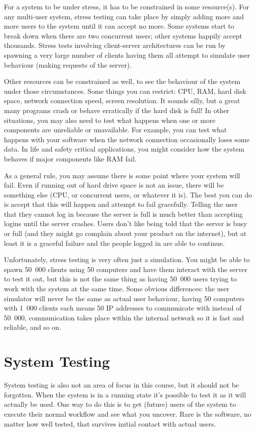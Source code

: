 For a system to be under stress, it has to be constrained in some resource(s). For any multi-user system, stress testing can take place by simply adding more and more users to the system until it can accept no more. Some systems start to break down when there are two concurrent users; other systems happily accept thousands.  Stress tests involving client-server architectures can be run by spawning a very large number of clients having them all attempt to simulate user behaviour (making requests of the server).

Other resources can be constrained as well, to see the behaviour of the system under those circumstances. Some things you can restrict: CPU, RAM, hard disk space, network connection speed, screen resolution. It sounds silly, but a great many programs crash or behave erratically if the hard disk is full! In other situations, you may also need to test what happens when one or more components are unreliable or unavailable. For example, you can test what happens with your software when the network connection occasionally loses some data. In life and safety critical applications, you might consider how the system behaves if major components like RAM fail.

As a general rule, you may assume there is some point where your system will fail. Even if running out of hard drive space is not an issue, there will be something else (CPU, or concurrent users, or whatever it is). The best you can do is accept that this will happen and attempt to fail gracefully. Telling the user that they cannot log in because the server is full is much better than accepting logins until the server crashes. Users don't like being told that the server is busy or full (and they might go complain about your product on the internet), but at least it is a graceful failure and the people logged in are able to continue.

Unfortunately, stress testing is very often just a simulation. You might be able to spawn 50~000 clients using 50 computers and have them interact with the server to test it out, but this is not the same thing as having 50~000 users trying to work with the system at the same time. Some obvious differences: the user simulator will never be the same as actual user behaviour, having 50 computers with 1~000 clients each means 50 IP addresses to communicate with instead of 50~000, communication takes place within the internal network so it is fast and reliable, and so on.

\section*{System Testing}
System testing is also not an area of focus in this course, but it should not be forgotten. When the system is in a running state it's possible to test it as it will actually be used. One way to do this is to get (future) users of the system to execute their normal workflow and see what you uncover. Rare is the software, no matter how well tested, that survives initial contact with actual users.

